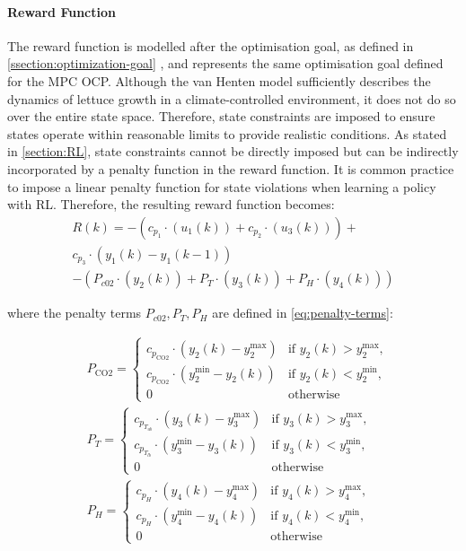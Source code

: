\paragraph{Reward Function}\label{paragraph:reward-function}
The reward function is modelled after the optimisation goal, as defined in \autoref{ssection:optimization-goal} , and represents the same optimisation goal defined for the MPC OCP. Although the van Henten model sufficiently describes the dynamics of lettuce growth in a climate-controlled environment, it does not do so over the entire state space. Therefore, state constraints are imposed to ensure states operate within reasonable limits to provide realistic conditions. As stated in \autoref{section:RL}, state constraints cannot be directly imposed but can be indirectly incorporated by a penalty function in the reward function. It is common practice to impose a linear penalty function for state violations when learning a policy with RL. Therefore, the resulting reward function becomes:
\begin{multline}\label{eq:reward_fn}
		 R(k)  =  - (c_{p_1} \cdot (u_1(k)) + c_{p_2} \cdot (u_3(k))) + \\ c_{p_3} \cdot (y_1(k)- y_1(k-1)) \\
		 - (P_{c02} \cdot (y_2(k) ) + P_T \cdot (y_3(k)) + P_H \cdot (y_4(k)) )
\end{multline}

where the penalty terms $P_{c02},P_T,P_H$ are defined in \autoref{eq:penalty-terms}:

\begin{equation}\label{eq:penalty-terms}
	\begin{aligned}
		& P_{\text{CO2}} = 
		\begin{cases} 
			c_{p_{\text{CO2}}} \cdot (y_2(k) - y_2^{\text{max}}) & \text{if } y_2(k) > y_2^{\text{max}} , \\
			c_{p_{\text{CO2}}} \cdot (y_2^{\text{min}} - y_2(k)) & \text{if } y_2(k) < y_2^{\text{min}} , \\
			0 & \text{otherwise}
		\end{cases}
		\\
		& P_{T} = 
		\begin{cases} 
			c_{p_{T_{ub}}} \cdot (y_3(k) - y_3^{\text{max}}) & \text{if } y_3(k) > y_3^{\text{max}} , \\
			c_{p_{T_{lb}}} \cdot (y_3^{\text{min}} - y_3(k)) & \text{if } y_3(k) < y_3^{\text{min}} , \\
			0 & \text{otherwise}
		\end{cases}
		\\
		& P_{H} = 
		\begin{cases} 
			c_{p_{H}} \cdot (y_4(k) - y_4^{\text{max}}) & \text{if } y_4(k) > y_4^{\text{max}} , \\
			c_{p_{H}} \cdot (y_4^{\text{min}} - y_4(k)) & \text{if } y_4(k) < y_4^{\text{min}} , \\
			0 & \text{otherwise}
		\end{cases}
		\\
	\end{aligned}
\end{equation}

